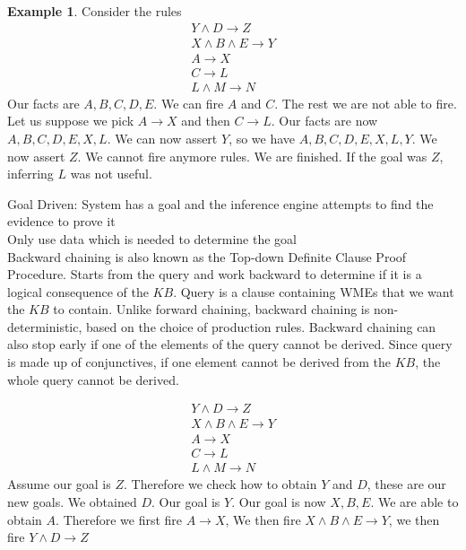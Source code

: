 \documentclass[a4paper]{article}
\theoremstyle{plain}
\theoremstyle{definition}
\newtheorem{defn}{Definition}[section]
\newtheorem{exmp}{Example}[section]
\theoremstyle{remark}
\begin{document}
\begin{exmp}
	Consider the rules
	\begin{align*}
		Y \land D \to Z \\
		X \land B \land E \to Y \\
		A \to X \\
		C \to L\\
		L \land M \to  N
	\end{align*}
	Our facts are $A,B,C,D,E$. We can fire $A$ and $C$. The rest we are not able to fire. Let us suppose we pick $A \to X$ and then $C \to L$. Our facts are now $A,B,C,D,E,X,L$. We can now assert  $Y$, so we have $A,B,C,D,E,X,L,Y$. We now assert $Z$. We cannot fire anymore rules. We are finished. If the goal was $Z$, inferring $L $ was not useful. 
\end{exmp}
\begin{tcolorbox}[colback=black!3!white,colframe=black!60!white,title=\begin{defn}Backward Chaining \label{Backward Chaining}\end{defn}]
Goal Driven: System has a goal and the inference engine attempts to find the evidence to prove it\\
Only use data which is needed to determine the goal\\
Backward chaining is also known as the Top-down Definite Clause Proof Procedure. Starts from the query and work backward to determine if it is a logical consequence of the $KB$. Query is a clause containing WMEs that we want the $KB$ to contain. Unlike forward chaining, backward chaining is non-deterministic, based on the choice of production rules. Backward chaining can also stop early if one of the elements of the query cannot be derived. Since query is made up of conjunctives, if one element cannot be derived from the $KB$, the whole query cannot be derived.
\end{tcolorbox}
	\begin{align*}
		Y \land D \to Z \\
		X \land B \land E \to Y \\
		A \to X \\
		C \to L\\
		L \land M \to  N
	\end{align*}
	Assume our goal is $Z$. Therefore we check how to obtain $Y$ and $D$, these are our new goals. We obtained $D$. Our goal is $Y$. Our goal is now $X,B,E$. We are able to obtain $A$. Therefore we first fire $A\to X$, We then fire $X \land B \land E \to Y$, we then fire $Y \land D \to Z$
\end{document}
